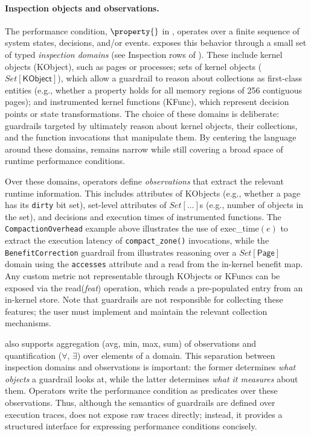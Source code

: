 \paragraph{Inspection objects and observations.}
The performance condition, $\property{}$ in , operates over a finite sequence of system states, decisions, and/or events.
\lang exposes this behavior through a small set of typed \emph{inspection domains} (see Inspection rows of ).
These include kernel objects (\textsf{KObject}), such as pages or processes; sets of kernel objects ($Set[\textsf{KObject}]$), which allow a guardrail to reason about collections as first-class entities (e.g., whether a property holds for all memory regions of 256 contiguous pages); and instrumented kernel functions (\textsf{KFunc}), which represent decision points or state transformations.
The choice of these domains is deliberate: guardrails targeted by \lang ultimately reason about kernel objects, their collections, and the function invocations that manipulate them.
By centering the language around these domains, \lang remains narrow while still covering a broad space of runtime performance conditions.

Over these domains, operators define \emph{observations} that extract the relevant runtime information.
This includes attributes of \textsf{KObject}s (e.g., whether a page has its {\tt dirty} bit set), set-level attributes of $Set[\ldots]$s (e.g., number of objects in the set), and decisions and execution times of instrumented functions.
The {\tt CompactionOverhead} example above illustrates the use of {\sf exec\_time}$(e)$ to extract the execution latency of {\tt compact\_zone()} invocations, while the {\tt BenefitCorrection} guardrail from  illustrates reasoning over a $Set[\textsf{Page}]$ domain using the {\tt accesses} attribute and a {\sf read} from the in-kernel benefit map.
Any custom metric not representable through \textsf{KObject}s or \textsf{KFunc}s can be exposed via the {\sf read}(\textit{feat}) operation, which reads a pre-populated entry from an in-kernel store.
Note that guardrails are not responsible for collecting these features; the user must implement and maintain the relevant collection mechanisms.

\lang also supports aggregation ({\sf avg}, {\sf min}, {\sf max}, {\sf sum}) of observations and quantification ($\forall$, $\exists$) over elements of a domain.
This separation between inspection domains and observations is important: the former determines \emph{what objects} a guardrail looks at, while the latter determines \emph{what it measures} about them.
Operators write the performance condition as predicates over these observations.
Thus, although the semantics of guardrails are defined over execution traces, \lang does not expose raw traces directly; instead, it provides a structured interface for expressing performance conditions concisely.

